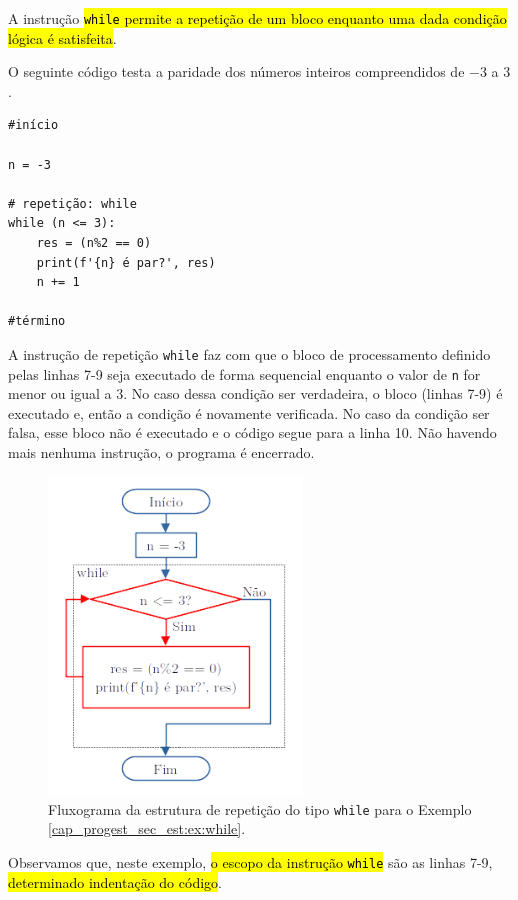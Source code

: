A instrução \hl{\texttt{while} permite a repetição de um bloco enquanto uma dada condição lógica é satisfeita}.

\begin{ex}\label{cap_progest_sec_est:ex:while}
  O seguinte código testa a paridade dos números inteiros compreendidos de $-3$ a $3$.

\begin{lstlisting}
#início

n = -3

# repetição: while
while (n <= 3):
    res = (n%2 == 0)
    print(f'{n} é par?', res)
    n += 1
    
#término
\end{lstlisting}

A instrução de repetição \lstinline+while+ faz com que o bloco de processamento definido pelas linhas 7-9 seja executado de forma sequencial enquanto o valor de \lstinline+n+ for menor ou igual a 3. No caso dessa condição ser verdadeira, o bloco (linhas 7-9) é executado e, então a condição é novamente verificada. No caso da condição ser falsa, esse bloco não é executado e o código segue para a linha 10. Não havendo mais nenhuma instrução, o programa é encerrado.

  \begin{figure}[H]
    \centering
    \includegraphics[width=0.6\textwidth]{./cap_progest/dados/fig_fg_while_ex/fig}
    \caption{Fluxograma da estrutura de repetição do tipo \lstinline+while+ para o Exemplo \ref{cap_progest_sec_est:ex:while}.}
    \label{cap_progest_sec_est:fig:fg_while_ex}
  \end{figure}

  Observamos que, neste exemplo, \hl{o escopo da instrução \texttt{while}} são as linhas 7-9, \hl{determinado indentação do código}.
\end{ex}

